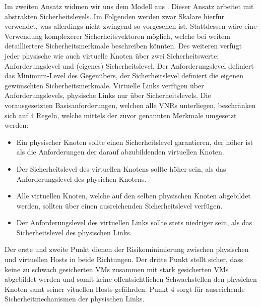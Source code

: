 \documentclass{lni}
\begin{document}
Im zweiten Ansatz widmen wir uns dem Modell aus \cite{algo2}. Dieser Ansatz arbeitet mit abstrakten Sicherheitslevels. Im Folgenden werden zwar Skalare hierfür verwendet, was allerdings nicht zwingend so vorgesehen ist. Stattdessen wäre eine Verwendung komplexerer Sicherheitsvektoren möglich, welche bei weitem detailliertere Sicherheitsmerkmale  beschreiben könnten. Des weiteren verfügt jeder physische wie auch virtuelle Knoten über zwei Sicherheitswerte: Anforderungslevel und (eigenes) Sicherheitslevel. Der Anforderungslevel definiert das Minimum-Level des Gegenübers, der Sicherheitslevel definiert die eigenen gewünschten Sicherheitsmerkmale. Virtuelle Links verfügen über Anforderungslevels, physische Links nur über Sicherheitslevels. Die vorausgesetzten Basisanforderungen, welchen alle VNRs unterliegen, beschränken sich auf 4 Regeln, welche mittels der zuvor genannten Merkmale umgesetzt werden:
\begin{itemize}
\item Ein physischer Knoten sollte einen Sicherheitslevel garantieren, 
   der höher ist als die Anforderungen der darauf abzubildenden
   virtuellen Knoten.

\item Der Sicherheitslevel des virtuellen Knotens sollte höher sein, 
   als das Anforderungslevel des physichen Knotens.

\item Alle virtuellen Knoten, welche auf den selben physischen Knoten
   abgebildet werden, sollten über einen ausreichenden Sicherheitslevel
   verfügen. 

\item Der Anforderungslevel des virtuellen Links sollte stets niedriger
   sein, als das Sicherheitslevel des physischen Links.
\end{itemize}%

Der erste und zweite Punkt dienen der Risikominimierung zwischen physischen und virtuellen Hosts in beide Richtungen. Der dritte Punkt stellt sicher, dass keine zu schwach gesicherten VMs zusammen mit stark gesicherten VMs abgebildet werden und somit keine offentsichtlichen Schwachstellen den physichen Knoten samt seiner vituellen Hosts gefährden. Punkt 4 sorgt für ausreichende Sicherheitmechanismen der physischen Links.
\end{document}

